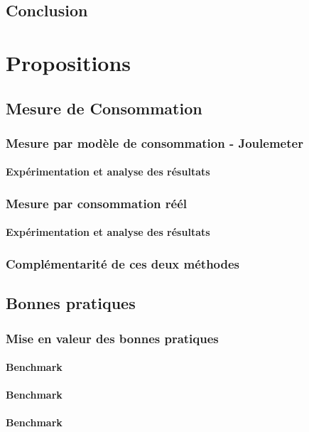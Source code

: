 \documentclass[a4paper, 11pt]{report}
\begin{document}
\section{Conclusion}

\chapter{Propositions}
\section{Mesure de Consommation}
    \subsection{Mesure par modèle de consommation - Joulemeter}
        \subsubsection{Expérimentation et analyse des résultats}
    \subsection{Mesure par consommation réél}
        \subsubsection{Expérimentation et analyse des résultats}
    \subsection{Complémentarité de ces deux méthodes}

    \section{Bonnes pratiques}
    \subsection{Mise en valeur des bonnes pratiques}
        \subsubsection{Benchmark}
        \subsubsection{Benchmark}
        \subsubsection{Benchmark}
\end{document}

